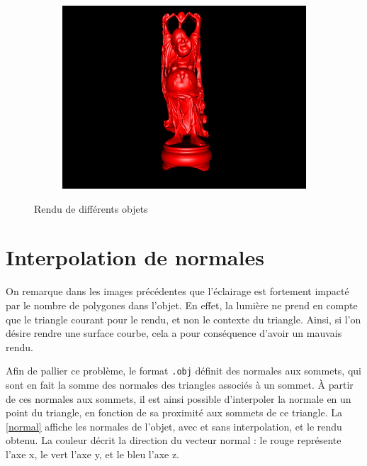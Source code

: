 \documentclass{article}
\begin{document}
\begin{figure}[hb]
  \begin{subfigure}{0.45\textwidth}
    \includegraphics[width=1\textwidth]{images/obj3.png}
  \end{subfigure}
  \caption{Rendu de différents objets\label{obj}}
\end{figure}

\section{Interpolation de normales}

On remarque dans les images précédentes que l'éclairage est fortement impacté
par le nombre de polygones dans l'objet. En effet, la lumière ne prend en
compte que le triangle courant pour le rendu, et non le contexte du triangle.
Ainsi, si l'on désire rendre une surface courbe, cela a pour conséquence
d'avoir un mauvais rendu.

Afin de pallier ce problème, le format \texttt{.obj} définit des normales aux sommets,
qui sont en fait la somme des normales des triangles associés à un sommet. À
partir de ces normales aux sommets, il est ainsi possible d'interpoler la
normale en un point du triangle, en fonction de sa proximité aux sommets de ce
triangle. La \cref{normal} affiche les normales de l'objet, avec et sans
interpolation, et le rendu obtenu. La couleur décrit la direction du vecteur
normal : le rouge représente l'axe x, le vert l'axe y, et le bleu l'axe z.
\end{document}
